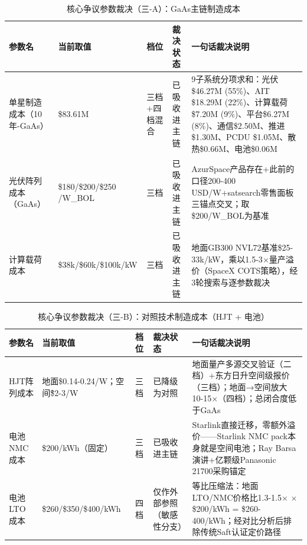 \clearpage

\begin{table}[H]
  \centering
  \caption{核心争议参数裁决（三-A）：GaAs主链制造成本}
  \label{tab:core-verdicts-cost-gaas}
  \small
  \begin{tabularx}{\textwidth}{
    >{\raggedright\arraybackslash}p{2.7cm}
    >{\raggedright\arraybackslash}p{2.2cm}
    >{\centering\arraybackslash}p{1.5cm}
    >{\raggedright\arraybackslash}p{2.1cm}
    >{\raggedright\arraybackslash}X
  }
  \toprule
  \textbf{参数名} & \textbf{当前取值} & \textbf{档位} & \textbf{裁决状态} & \textbf{一句话裁决说明} \\
  \midrule
  单星制造成本（10年-GaAs） & \$83.61M & 三档+四档混合 & 已吸收进主链 & 9子系统分项求和：光伏\$46.27M (55\%)、AIT \$18.29M (22\%)、计算载荷\$7.20M (9\%)、平台\$6.27M (8\%)、通信\$2.50M、推进\$1.30M、PCDU \$1.05M、散热\$0.66M、电池\$0.06M \\
  光伏阵列成本（GaAs） & \$180/\$200/\$250 /W\_BOL & 三档 & 已吸收进主链 & AzurSpace产品存在+此前的口径200-400 USD/W+satsearch零售面板三锚点交叉；取\$200/W\_BOL为基准 \\
  计算载荷成本 & \$38k/\$60k/\$100k/kW & 三档 & 已吸收进主链 & 地面GB300 NVL72基准\$25-33k/kW，乘以1.5-3$\times$量产溢价（SpaceX COTS策略），经3轮搜索与逐参数裁决 \\
  \bottomrule
  \end{tabularx}
\end{table}

\begin{table}[H]
  \centering
  \caption{核心争议参数裁决（三-B）：对照技术制造成本（HJT + 电池）}
  \label{tab:core-verdicts-cost-other}
  \small
  \begin{tabularx}{\textwidth}{
    >{\raggedright\arraybackslash}p{2.7cm}
    >{\raggedright\arraybackslash}p{2.2cm}
    >{\centering\arraybackslash}p{1.5cm}
    >{\raggedright\arraybackslash}p{2.1cm}
    >{\raggedright\arraybackslash}X
  }
  \toprule
  \textbf{参数名} & \textbf{当前取值} & \textbf{档位} & \textbf{裁决状态} & \textbf{一句话裁决说明} \\
  \midrule
  HJT阵列成本 & 地面\$0.14-0.24/W；空间\~\$2-3/W & 三档 & 已降级为对照 & 地面量产多源交叉验证（二档）+东方日升空间级报价（三档）；地面→空间放大10-15$\times$（四档）；总闭合度低于GaAs \\
  电池NMC成本 & \$200/kWh（固定） & 三档 & 已吸收进主链 & Starlink直接迁移，零额外溢价——Starlink NMC pack本身就是空间电池；Ray Barsa演讲+亿颗级Panasonic 21700采购锚定 \\
  电池LTO成本 & \$260/\$350/\$400/kWh & 四档 & 仅作外部参照（敏感性分支） & 等比压缩法：地面LTO/NMC价格比1.3-1.5$\times$ $\times$ \$200/kWh = \$260-400/kWh；经对比分析后排除传统Saft认证定价路径 \\
  \bottomrule
  \end{tabularx}
\end{table}


